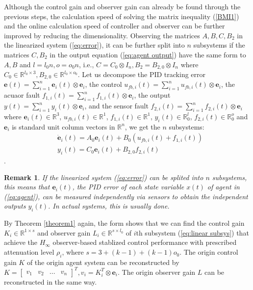 \documentclass{ieeeaccess}
\newtheorem{remark}{Remark}
\begin{document}
Although the control gain and observer gain can already be found through the previous steps, the calculation speed of solving the matrix inequality (\ref{BMI1}) and the online calculation speed of controller and observer can be further improved by reducing the dimensionality. Observing the matrices $A,B,C,B_2$ in the linearized system (\ref{eq:error}), it can be further split into $n$ subsystems if the matrices $C,B_2$ in the output equation (\ref{eq:agent output}) have the same form to $A,B$ and $l=l_0n, o=o_0n$, i.e., $C = C_0\otimes I_n,B_2 = B_{2,0}\otimes I_n$ where $C_0\in\mathbb{R}^{l_0\times 3},B_{2,0}\in\mathbb{R}^{l_0\times o_0}$. Let us decompose the PID tracking error $\pmb{e}(t)=\sum_{i=1}^{n} \pmb{e}_i(t)\otimes\mathbf{e}_i$, the control $u_{fb,i}(t)=\sum_{i=1}^{n} {u}_{fb,i}(t)\otimes\mathbf{e}_i$, the acuaor fault $f_{1,i}(t)=\sum_{i=1}^{n} {f}_{1,i}(t)\otimes\mathbf{e}_i$, the output $y(t)=\sum_{i=1}^{n} {y}_i(t)\otimes\mathbf{e}_i$, and the sensor fault $f_{2,i}(t)=\sum_{i=1}^{n} {f}_{2,i}(t)\otimes\mathbf{e}_i$ where $\pmb{e}_i(t)\in\mathbb{R}^3$, $u_{fb,i}(t)\in\mathbb{R}^1$, $f_{1,i}(t)\in\mathbb{R}^1$, $y_i(t)\in\mathbb{R}^l_0$, $f_{2,i}(t)\in\mathbb{R}^o_0$ and $\mathbf{e}_i$ is standard unit column vectors in $\mathbb{R}^n$, we get the $n$ subsystems:
\begin{equation} \label{eq:linear subsys}
    \begin{split}
        & \dot{\pmb{e}}_i(t)=A_0\pmb{e}_i(t)+B_0(u_{fb,i}(t)+f_{1,i}(t)) \\
        & {y}_i(t)=C_0\pmb{e}_i(t)+B_{2,0}f_{2,i}(t)   
    \end{split}
\end{equation}.
\begin{remark}
    If the linearized system (\ref{eq:error}) can be splited into $n$ subsystems, this means that $\pmb{e}_i(t)$, the PID error of each state variable $x(t)$ of agent in (\ref{eq:agent}), can be measured independently via sensors to obtain the independent outputs $y_i(t)$. In actual systems, this is usually done.
\end{remark}

By Theorem \ref{theorem1} again, the form shows that we can find the control gain $K_i\in\mathbb{R}^{1\times s}$ and observer gain $L_i\in\mathbb{R}^{s\times l_0}$ of $i$th subsystem (\ref{eq:linear subsys}) that achieve the $H_\infty$ observer-based stablized control performance with prescribed attenuation level $\rho_i$, where $s=3+(k-1)+(k-1)o_0$. The origin control gain $K$ of the origin agent system can be reconstructed by $K = \begin{bmatrix}
    \mathit{v}_1 & \mathit{v}_2 & ... & \mathit{v}_n
\end{bmatrix}^T, \mathit{v}_i=K_i^T\otimes\mathbf{e}_i$. The origin observer gain $L$ can be reconstructed in the same way. 
\end{document}
